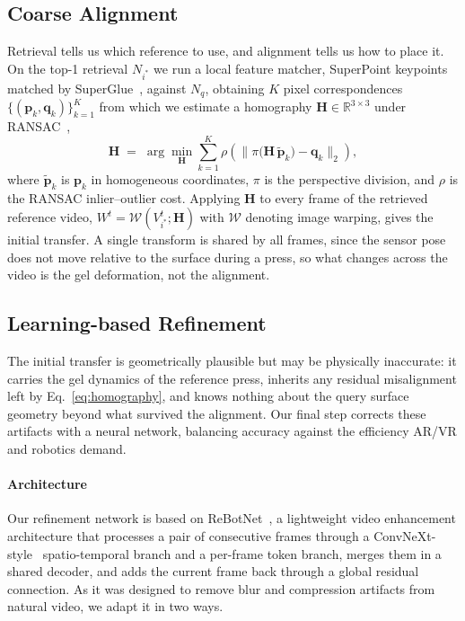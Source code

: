 \subsection{Coarse Alignment}
\label{sec:coarse}

Retrieval tells us which reference to use, and alignment tells us how to place it. On
the top-1 retrieval $N_{i^{*}}$ we run a local feature matcher, SuperPoint
keypoints~\cite{superpoint} matched by SuperGlue~\cite{superglue}, against $N_q$, obtaining $K$
pixel correspondences $\{(\mathbf{p}_k, \mathbf{q}_k)\}_{k=1}^{K}$ from which we estimate a
homography $\mathbf{H} \in \mathbb{R}^{3\times 3}$ under RANSAC~\cite{ransac},
\begin{equation}
  \mathbf{H} \;=\; \arg\min_{\mathbf{H}} \sum_{k=1}^{K}
  \rho\!\left( \bigl\lVert \pi\bigl(\mathbf{H}\,\tilde{\mathbf{p}}_k\bigr) - \mathbf{q}_k
  \bigr\rVert_2 \right),
  \label{eq:homography}
\end{equation}
where $\tilde{\mathbf{p}}_k$ is $\mathbf{p}_k$ in homogeneous coordinates, $\pi$ is the perspective
division, and $\rho$ is the RANSAC inlier--outlier cost. Applying $\mathbf{H}$ to every frame of
the retrieved reference video, $W^{t} = \mathcal{W}( V_{i^{*}}^{t}; \mathbf{H} )$ with
$\mathcal{W}$ denoting image warping, gives the initial transfer. A single transform is shared by
all frames, since the sensor pose does not move relative to the surface during a press, so what
changes across the video is the gel deformation, not the alignment.

\subsection{Learning-based Refinement}
\label{sec:refine}

The initial transfer is geometrically plausible but may be physically inaccurate: it carries the gel
dynamics of the reference press, inherits any residual misalignment left by
Eq.~\ref{eq:homography}, and knows nothing about the query surface geometry beyond what survived
the alignment. Our final step corrects these artifacts with a neural network, balancing accuracy
against the efficiency AR/VR and robotics demand.

\paragraph{Architecture}
Our refinement network is based on ReBotNet~\cite{rebotnet}, a lightweight video enhancement
architecture that processes a pair of consecutive frames through a ConvNeXt-style~\cite{convnext}
spatio-temporal branch and a per-frame token branch, merges them in a shared decoder, and adds the
current frame back through a global residual connection. As it was designed to remove blur and
compression artifacts from natural video, we adapt it in two ways.


